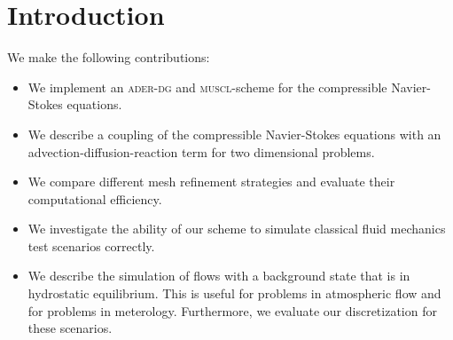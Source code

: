\chapter{Introduction}\label{chap:introduction}
We make the following contributions:
\begin{itemize}
\item We implement an \textsc{ader-dg} and \textsc{muscl}-scheme for the compressible Navier-Stokes equations.
\item We describe a coupling of the compressible Navier-Stokes equations with an advection-diffusion-reaction term for two dimensional problems.
\item We compare different mesh refinement strategies and evaluate their computational efficiency.
\item We investigate the ability of our scheme to simulate classical fluid mechanics test scenarios correctly.
\item We describe the simulation of flows with a background state that is in hydrostatic equilibrium.
  This is useful for problems in atmospheric flow and for problems in meterology.
  Furthermore, we evaluate our discretization for these scenarios.
\end{itemize}

